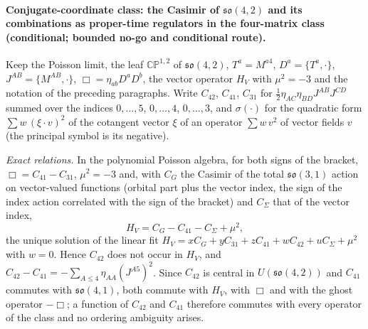 \paragraph{Conjugate-coordinate class: the Casimir of \(\mathfrak{so}(4,2)\) and its combinations as proper-time regulators in the four-matrix class (conditional; bounded no-go and conditional route).}
Keep the Poisson limit, the leaf \(\mathbb{CP}^{1,2}\) of \(\mathfrak{so}(4,2)\), \(T^a=M^{a4}\), \(D^a=\{T^a,\cdot\}\), \(J^{AB}=\{M^{AB},\cdot\}\), \(\Box=\eta_{ab}D^aD^b\), the vector operator \(H_V\) with \(\mu^2=-3\) and the notation of the preceding paragraphs. Write \(C_{42}\), \(C_{41}\), \(C_{31}\) for \(\tfrac12\eta_{AC}\eta_{BD}J^{AB}J^{CD}\) summed over the indices \(0,\dots,5\), \(0,\dots,4\), \(0,\dots,3\), and \(\sigma(\cdot)\) for the quadratic form \(\sum w\,(\xi\!\cdot\!v)^2\) of the cotangent vector \(\xi\) of an operator \(\sum w\,v^2\) of vector fields \(v\) (the principal symbol is its negative).

\emph{Exact relations.} In the polynomial Poisson algebra, for both signs of the bracket, \(\Box=C_{41}-C_{31}\), \(\mu^2=-3\) and, with \(C_G\) the Casimir of the total \(\mathfrak{so}(3,1)\) action on vector-valued functions (orbital part plus the vector index, the sign of the index action correlated with the sign of the bracket) and \(C_\Sigma\) that of the vector index,
\[
H_V=C_G-C_{41}-C_\Sigma+\mu^2 ,
\]
the unique solution of the linear fit \(H_V=xC_G+yC_{31}+zC_{41}+wC_{42}+uC_\Sigma+\mu^2\) with \(w=0\). Hence \(C_{42}\) does not occur in \(H_V\), and \(C_{42}-C_{41}=-\sum_{A\le4}\eta_{AA}(J^{A5})^2\). Since \(C_{42}\) is central in \(U(\mathfrak{so}(4,2))\) and \(C_{41}\) commutes with \(\mathfrak{so}(4,1)\), both commute with \(H_V\), with \(\Box\) and with the ghost operator \(-\Box\); a function of \(C_{42}\) and \(C_{41}\) therefore commutes with every operator of the class and no ordering ambiguity arises.

